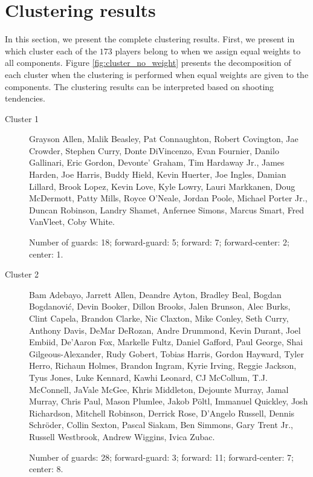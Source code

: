 
\section{Clustering results} %
\label{sec:clustering_results}

In this section, we present the complete clustering results. First, we present in which cluster each of the $173$ players belong to when we assign equal weights to all components. Figure \ref{fig:cluster_no_weight} presents the decomposition of each cluster when the clustering is performed when equal weights are given to the components. The clustering results can be interpreted based on shooting tendencies.


\begin{description}
	\item[Cluster 1] Grayson Allen, Malik Beasley, Pat Connaughton, Robert Covington, Jae Crowder, Stephen Curry, Donte DiVincenzo, Evan Fournier, Danilo Gallinari, Eric Gordon, Devonte' Graham, Tim Hardaway Jr., James Harden, Joe Harris, Buddy Hield, Kevin Huerter, Joe Ingles, Damian Lillard, Brook Lopez, Kevin Love, Kyle Lowry, Lauri Markkanen, Doug McDermott, Patty Mills, Royce O'Neale, Jordan Poole, Michael Porter Jr., Duncan Robinson, Landry Shamet, Anfernee Simons, Marcus Smart, Fred VanVleet, Coby White.

	      Number of guards: 18; forward-guard: 5; forward: 7; forward-center: 2; center: 1.

	\item[Cluster 2]  Bam Adebayo, Jarrett Allen, Deandre Ayton, Bradley Beal, Bogdan Bogdanović, Devin Booker, Dillon Brooks, Jalen Brunson, Alec Burks, Clint Capela, Brandon Clarke, Nic Claxton, Mike Conley, Seth Curry, Anthony Davis, DeMar DeRozan, Andre Drummond, Kevin Durant, Joel Embiid, De'Aaron Fox, Markelle Fultz, Daniel Gafford, Paul George, Shai Gilgeous-Alexander, Rudy Gobert, Tobias Harris, Gordon Hayward, Tyler Herro, Richaun Holmes, Brandon Ingram, Kyrie Irving, Reggie Jackson, Tyus Jones, Luke Kennard, Kawhi Leonard, CJ McCollum, T.J. McConnell, JaVale McGee, Khris Middleton, Dejounte Murray, Jamal Murray, Chris Paul, Mason Plumlee, Jakob Pöltl, Immanuel Quickley, Josh Richardson, Mitchell Robinson, Derrick Rose, D'Angelo Russell, Dennis Schröder, Collin Sexton, Pascal Siakam, Ben Simmons, Gary Trent Jr., Russell Westbrook, Andrew Wiggins, Ivica Zubac.

	      Number of guards: 28; forward-guard: 3; forward: 11; forward-center: 7; center: 8.


\end{description}
